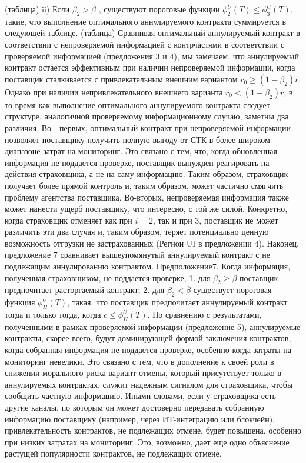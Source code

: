 \documentclass[a4paper,12pt]{article}
\begin{document}
(таблица)
ii) Если $\beta_{2} > \overline{\beta}$ , существуют пороговые функции $\phi_{2}^{U}(T)\leq \phi_{3}^{U}(T)$, такие, что выполнение оптимального аннулируемого контракта суммируется в следующей таблице.
(таблица)
Сравнивая оптимальный аннулируемый контракт в соответствии с непроверяемой информацией с контрчастями в соответствии с проверяемой информацией (предложения 3 и 4), мы замечаем, что аннулируемый контракт остается эффективным при наличии непроверяемой информации, когда поставщик сталкивается с привлекательным внешним вариантом $r_{0} \geq (1-\beta_{2})r$. Однако при наличии непривлекательного внешнего варианта $r_{0} < (1-\beta_{2})r$, в то время как выполнение оптимального аннулируемого контракта следует структуре, аналогичной проверяемому информационному случаю, заметны два различия. Во - первых, оптимальный контракт при непроверяемой информации позволяет поставщику получить полную выгоду от СТК в более широком диапазоне затрат на мониторинг. Это связано с тем, что, когда обновленная информация не поддается проверке, поставщик вынужден реагировать на действия страховщика, а не на саму информацию. Таким образом, страховщик получает более прямой контроль и, таким образом, может частично смягчить проблему агентства поставщика. Во-вторых, непроверяемая информация также может нанести ущерб поставщику, что интересно, с той же силой. Конкретно, когда страховщик отменяет как при $i = 2$, так и при 3, поставщик не может различить эти два случая и, таким образом, теряет потенциально ценную возможность отгрузки не застрахованных (Регион UI в предложении 4).
Наконец, предложение 7 сравнивает вышеупомянутый аннулируемый контракт с не подлежащим аннулированию контрактом.
Предположение7. Когда информация, полученная страховщиком, не поддается проверке,
1. для $\beta_{2} \geq \overline{\beta}$ поставщик предпочитает расторгаемый контракт;
2. для $\beta_{2} < \overline{\beta}$ существует пороговая функция $\phi_{H}^{U}(T)$, такая, что поставщик предпочитает аннулируемый
контракт тогда и только тогда, когда $c \leq \phi_{H}^{U}(T)$.
По сравнению с результатами, полученными в рамках проверяемой информации (предложение 5), аннулируемые контракты, скорее всего, будут доминирующей формой заключения контрактов, когда собранная информация не поддается проверке, особенно когда затраты на мониторинг невелики. Это связано с тем, что в дополнение к своей роли в снижении морального риска вариант отмены, который присутствует только в аннулируемых контрактах, служит надежным сигналом для страховщика, чтобы сообщить частную информацию. Иными словами, если у страховщика есть другие каналы, по которым он может достоверно передавать собранную информацию поставщику (например, через ИТ-интеграцию или блокчейн), привлекательность контрактов, не подлежащих отмене, будет повышена, особенно при низких затратах на мониторинг. Это, возможно, дает еще одно объяснение растущей популярности контрактов, не подлежащих отмене.
\end{document}
